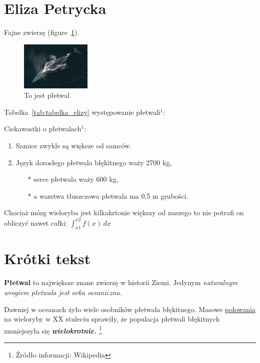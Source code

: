 \section{Eliza Petrycka}
\label{sec:Eliza}

Fajne zwierzę (figure~\ref{fig:pletwal}).

\begin{figure}[htbp]
    \centering
    \includegraphics[width=0.3\textwidth]{pictures/eliza.jpg}
    \caption{To jest płetwal}
    \label{fig:pletwal}
\end{figure}

Tabelka~\ref{tab:tabelka_elizy} występowanie płetwali$^1$:


Ciekawostki o płetwalach$^1$:
\begin{enumerate}
  \item Samice zwykle są większe od samców.
  \item Język dorosłego płetwala błękitnego waży 2700 kg,
    \begin{itemize}
    \item[*] serce płetwala waży 600 kg,
    \item[*] a warstwa tłuszczowa płetwala ma 0,5 m grubości.
    \end{itemize}
\end{enumerate}

Chociaż mózg wieloryba jest kilkakrtonie większy od naszego to nie potrafi on obliczyć nawet całki: $\int_{x1}^{x2} f(x) \, dx$

\setlength{\parindent}{20pt}

\section*{Krótki tekst}

\textbf{Płetwal} to największe znane zwierzę w historii Ziemi. Jedynym \textit{ naturalnym wrogiem \emph{płetwala jest orka oceaniczna.}}

Dawniej w oceanach żyło wiele osobników płetwala błękitnego. 
\newline
Masowe \underline{polowania }na wieloryby w XX stuleciu sprawiły, że populacja płetwali błękitnych zmniejszyła się \textbf{\textit{wielokrotnie.}}
\footnote{Źródło informacji: Wikipedia}
